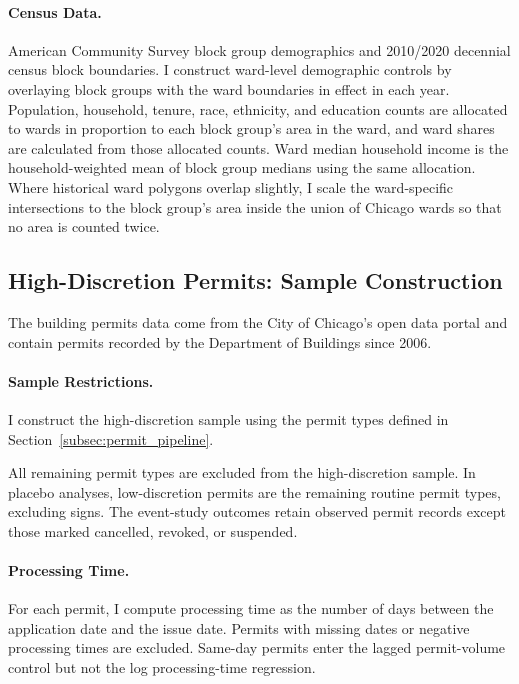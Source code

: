 \paragraph{Census Data.}
American Community Survey block group demographics and 2010/2020 decennial census block boundaries.
I construct ward-level demographic controls by overlaying block groups with the ward boundaries in effect in each year.
Population, household, tenure, race, ethnicity, and education counts are allocated to wards in proportion to each block group's area in the ward, and ward shares are calculated from those allocated counts.
Ward median household income is the household-weighted mean of block group medians using the same allocation.
Where historical ward polygons overlap slightly, I scale the ward-specific intersections to the block group's area inside the union of Chicago wards so that no area is counted twice.

\subsection{High-Discretion Permits: Sample Construction}
\label{subsec:permits_sample}

The building permits data come from the City of Chicago's open data portal and contain permits recorded by the Department of Buildings since 2006.

\paragraph{Sample Restrictions.}
I construct the high-discretion sample using the permit types defined in Section~\ref{subsec:permit_pipeline}.

All remaining permit types are excluded from the high-discretion sample.
In placebo analyses, low-discretion permits are the remaining routine permit types, excluding signs.
The event-study outcomes retain observed permit records except those marked cancelled, revoked, or suspended.

\paragraph{Processing Time.}
For each permit, I compute processing time as the number of days between the application date and the issue date.
Permits with missing dates or negative processing times are excluded.
Same-day permits enter the lagged permit-volume control but not the log processing-time regression.

